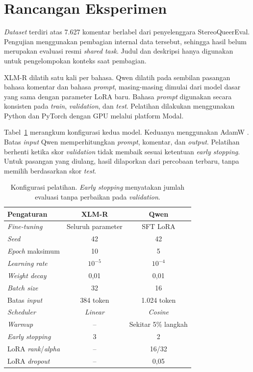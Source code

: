 \documentclass[11pt]{article}
\begin{document}
\section{Rancangan Eksperimen}
\textit{Dataset} terdiri atas 7.627 komentar berlabel dari penyelenggara StereoQueerEval. Pengujian menggunakan pembagian internal data tersebut, sehingga hasil belum merupakan evaluasi resmi \textit{shared task}. Judul dan deskripsi hanya digunakan untuk pengelompokan konteks saat pembagian.

XLM-R dilatih satu kali per bahasa. Qwen dilatih pada sembilan pasangan bahasa komentar dan bahasa \textit{prompt}, masing-masing dimulai dari model dasar yang sama dengan parameter LoRA baru. Bahasa \textit{prompt} digunakan secara konsisten pada \textit{train}, \textit{validation}, dan \textit{test}. Pelatihan dilakukan menggunakan Python dan PyTorch dengan GPU melalui platform Modal.

Tabel~\ref{tab:configuration} merangkum konfigurasi kedua model. Keduanya menggunakan AdamW \citep{loshchilov-hutter-2019-decoupled}. Batas \textit{input} Qwen memperhitungkan \textit{prompt}, komentar, dan \textit{output}. Pelatihan berhenti ketika skor \textit{validation} tidak membaik sesuai ketentuan \textit{early stopping}. Untuk pasangan yang diulang, hasil dilaporkan dari percobaan terbaru, tanpa memilih berdasarkan skor \textit{test}.

\begin{table}[t]
\centering\small
\setlength{\tabcolsep}{2.5pt}
\begin{tabular}{lcc}
\toprule
Pengaturan & XLM-R & Qwen \\
\midrule
\textit{Fine-tuning} & Seluruh parameter & SFT LoRA \\
\textit{Seed} & 42 & 42 \\
\textit{Epoch} maksimum & 10 & 5 \\
\textit{Learning rate} & $10^{-5}$ & $10^{-4}$ \\
\textit{Weight decay} & 0,01 & 0,01 \\
\textit{Batch size} & 32 & 16 \\
Batas \textit{input} & 384 token & 1.024 token \\
\textit{Scheduler} & \textit{Linear} & \textit{Cosine} \\
\textit{Warmup} & -- & Sekitar 5\% langkah \\
\textit{Early stopping} & 3 & 2 \\
LoRA \textit{rank}/\textit{alpha} & -- & 16/32 \\
LoRA \textit{dropout} & -- & 0,05 \\
\bottomrule
\end{tabular}
\caption{Konfigurasi pelatihan. \textit{Early stopping} menyatakan jumlah evaluasi tanpa perbaikan pada \textit{validation}.}
\label{tab:configuration}
\end{table}
\end{document}

